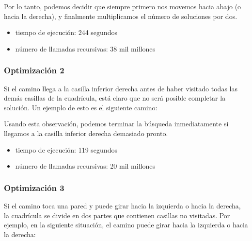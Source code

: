 Por lo tanto, podemos decidir que siempre primero
nos movemos hacia abajo (o hacia la derecha),
y finalmente multiplicamos el número de soluciones por dos.

\begin{itemize}[itemsep=0em,topsep=0.5em]
  \item tiempo de ejecución: 244 segundos
  \item número de llamadas recursivas: 38 mil millones
\end{itemize}

\subsubsection{Optimización 2}

Si el camino llega a la casilla inferior derecha
antes de haber visitado todas las demás casillas de la cuadrícula,
está claro que
no será posible completar la solución.
Un ejemplo de esto es el siguiente camino:

\begin{center}
\end{center}
Usando esta observación, podemos terminar la búsqueda
inmediatamente si llegamos a la casilla inferior derecha demasiado pronto.

\begin{itemize}[itemsep=0em,topsep=0.5em]
  \item tiempo de ejecución: 119 segundos
  \item número de llamadas recursivas: 20 mil millones
\end{itemize}

\subsubsection{Optimización 3}

Si el camino toca una pared
y puede girar hacia la izquierda o hacia la derecha,
la cuadrícula se divide en dos partes
que contienen casillas no visitadas.
Por ejemplo, en la siguiente situación,
el camino puede girar hacia la izquierda o hacia la derecha:

